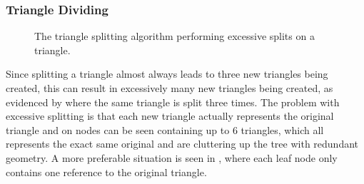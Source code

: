 \subsubsection{Triangle Dividing}

\begin{figure}
  \centering

  \vspace{3mm}
  \parbox{8cm}{\caption[Excessive splitting of a triangle.]{The triangle splitting
      algorithm performing excessive splits on a triangle.}\label{fig:excessiveSplitting}}
\end{figure}

Since splitting a triangle almost always leads to three new triangles being
created, this can result in excessively many new triangles being created, as
evidenced by  where the same triangle is split
three times. The problem with excessive splitting is that each new triangle
actually represents the original triangle and on 
nodes can be seen containing up to 6 triangles, which all represents the exact
same original and are cluttering up the tree with redundant geometry. A more
preferable situation is seen in , where each leaf node only
contains one reference to the original triangle.

